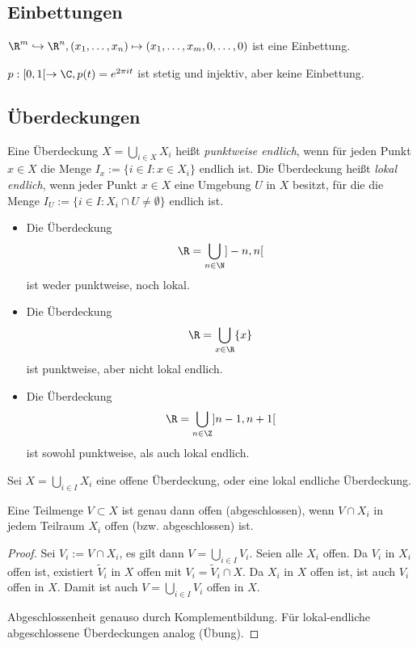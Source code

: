 
\subsection{Einbettungen}

\begin{ex}
	$\R^m \injto \R^n, (x_1, \dotsc, x_n) \mapsto (x_1, \dotsc, x_m, 0, \dotsc, 0)$ ist eine Einbettung.

	$p: [0,1[ \to \C, p(t) = e^{2\pi i t}$ ist stetig und injektiv, aber keine Einbettung.
\end{ex}

\subsection{Überdeckungen}

\begin{df}
	Eine Überdeckung $X = \bigcup_{i\in X} X_i$ heißt \emph{punktweise endlich}, wenn für jeden Punkt $x \in X$ die Menge $I_x := \{ i \in I : x \in X_i \}$ endlich ist.
	Die Überdeckung heißt \emph{lokal endlich}, wenn jeder Punkt $x \in X$ eine Umgebung $U$ in $X$ besitzt, für die die Menge $I_U := \{ i \in I : X_i \cap U \neq \emptyset \}$ endlich ist.
\end{df}

\begin{ex}
	\begin{itemize}
		\item
			Die Überdeckung
			\[
				\R = \bigcup_{n \in \N} ]-n, n[
			\]
			ist weder punktweise, noch lokal.
		\item
			Die Überdeckung
			\[
				\R = \bigcup_{x \in \R} \{x\}
			\]
			ist punktweise, aber nicht lokal endlich.
		\item
			Die Überdeckung
			\[
				\R = \bigcup_{n\in \Z} ]n-1, n+ 1[
			\]
			ist sowohl punktweise, als auch lokal endlich.
	\end{itemize}
\end{ex}

\begin{st} %
	Sei $X = \bigcup_{i\in I} X_i$ eine offene Überdeckung, oder eine lokal endliche Überdeckung.

	Eine Teilmenge $V \subset X$ ist genau dann offen (abgeschlossen), wenn $V \cap X_i$ in jedem Teilraum $X_i$ offen (bzw. abgeschlossen) ist.
	\begin{proof}
		Sei $V_i := V \cap X_i$, es gilt dann $V = \bigcup_{i\in I} V_i$.
		Seien alle $X_i$ offen.
		Da $V_i$ in $X_i$ offen ist, existiert $\tilde V_i$ in $X$ offen mit $V_i = \tilde V_i \cap X$.
		Da $X_i$ in $X$ offen ist, ist auch $V_i$ offen in $X$.
		Damit ist auch $V = \bigcup_{i\in I} V_i$ offen in $X$.

		Abgeschlossenheit genauso durch Komplementbildung.
		Für lokal-endliche abgeschlossene Überdeckungen analog (Übung). %
	\end{proof}
\end{st}

